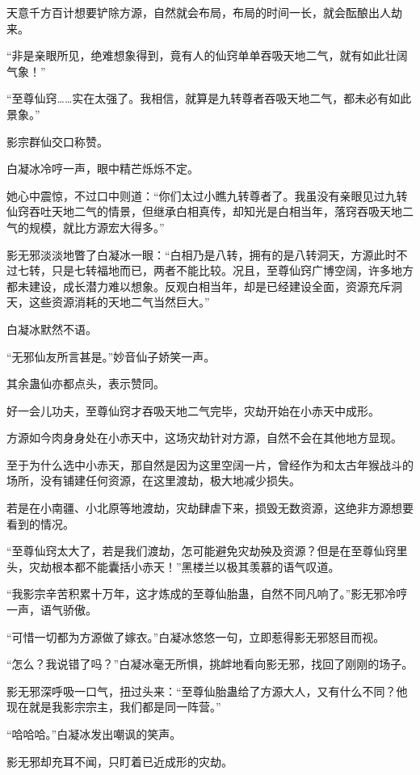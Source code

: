 \begin{this_body}
天意千方百计想要铲除方源，自然就会布局，布局的时间一长，就会酝酿出人劫来。

“非是亲眼所见，绝难想象得到，竟有人的仙窍单单吞吸天地二气，就有如此壮阔气象！”

“至尊仙窍……实在太强了。我相信，就算是九转尊者吞吸天地二气，都未必有如此景象。”

影宗群仙交口称赞。

白凝冰冷哼一声，眼中精芒烁烁不定。

她心中震惊，不过口中则道：“你们太过小瞧九转尊者了。我虽没有亲眼见过九转仙窍吞吐天地二气的情景，但继承白相真传，却知光是白相当年，落窍吞吸天地二气的规模，就比方源宏大得多。”

影无邪淡淡地瞥了白凝冰一眼：“白相乃是八转，拥有的是八转洞天，方源此时不过七转，只是七转福地而已，两者不能比较。况且，至尊仙窍广博空阔，许多地方都未建设，成长潜力难以想象。反观白相当年，却是已经建设全面，资源充斥洞天，这些资源消耗的天地二气当然巨大。”

白凝冰默然不语。

“无邪仙友所言甚是。”妙音仙子娇笑一声。

其余蛊仙亦都点头，表示赞同。

好一会儿功夫，至尊仙窍才吞吸天地二气完毕，灾劫开始在小赤天中成形。

方源如今肉身身处在小赤天中，这场灾劫针对方源，自然不会在其他地方显现。

至于为什么选中小赤天，那自然是因为这里空阔一片，曾经作为和太古年猴战斗的场所，没有铺建任何资源，在这里渡劫，极大地减少损失。

若是在小南疆、小北原等地渡劫，灾劫肆虐下来，损毁无数资源，这绝非方源想要看到的情况。

“至尊仙窍太大了，若是我们渡劫，怎可能避免灾劫殃及资源？但是在至尊仙窍里头，灾劫根本都不能囊括小赤天！”黑楼兰以极其羡慕的语气叹道。

“我影宗辛苦积累十万年，这才炼成的至尊仙胎蛊，自然不同凡响了。”影无邪冷哼一声，语气骄傲。

“可惜一切都为方源做了嫁衣。”白凝冰悠悠一句，立即惹得影无邪怒目而视。

“怎么？我说错了吗？”白凝冰毫无所惧，挑衅地看向影无邪，找回了刚刚的场子。

影无邪深呼吸一口气，扭过头来：“至尊仙胎蛊给了方源大人，又有什么不同？他现在就是我影宗宗主，我们都是同一阵营。”

“哈哈哈。”白凝冰发出嘲讽的笑声。

影无邪却充耳不闻，只盯着已近成形的灾劫。


\end{this_body}
